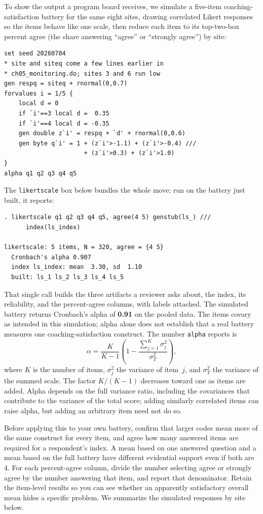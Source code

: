 To show the output a program board receives, we simulate a five-item coaching-satisfaction battery for the same eight sites, drawing correlated Likert responses so the items behave like one scale, then reduce each item to its top-two-box percent agree (the share answering \enquote{agree} or \enquote{strongly agree}) by site:
\par
{\footnotesize
\begin{verbatim}
set seed 20260704
* site and siteq come a few lines earlier in
* ch05_monitoring.do; sites 3 and 6 run low
gen respq = siteq + rnormal(0,0.7)
forvalues i = 1/5 {
    local d = 0
    if `i'==3 local d =  0.35
    if `i'==4 local d = -0.35
    gen double z`i' = respq + `d' + rnormal(0,0.6)
    gen byte q`i' = 1 + (z`i'>-1.1) + (z`i'>-0.4) ///
                      + (z`i'>0.3) + (z`i'>1.0)
}
alpha q1 q2 q3 q4 q5
\end{verbatim}
}
The \texttt{likertscale} box below bundles the whole move; run on the battery just built, it reports:
\par
{\footnotesize
\begin{verbatim}
. likertscale q1 q2 q3 q4 q5, agree(4 5) genstub(ls_) ///
      index(ls_index)

likertscale: 5 items, N = 320, agree = {4 5}
  Cronbach's alpha 0.907
  index ls_index: mean  3.30, sd  1.10
  built: ls_1 ls_2 ls_3 ls_4 ls_5
\end{verbatim}
}
That single call builds the three artifacts a reviewer asks about, the index, its reliability, and the percent-agree columns, with labels attached.
The simulated battery returns Cronbach's alpha of \textbf{0.91} on the pooled data. The items covary as intended in this simulation; alpha alone does not establish that a real battery measures one coaching-satisfaction construct. The number \texttt{alpha} reports is
\[
  \alpha=\frac{K}{K-1}\left(1-\frac{\sum_{j=1}^{K}\sigma_j^2}{\sigma_T^2}\right),
\]
where $K$ is the number of items, $\sigma_j^2$ the variance of item~$j$, and $\sigma_T^2$ the variance of the summed scale. The factor $K/(K-1)$ decreases toward one as items are added. Alpha depends on the full variance ratio, including the covariances that contribute to the variance of the total score; adding similarly correlated items can raise alpha, but adding an arbitrary item need not do so.

Before applying this to your own battery, confirm that larger codes mean more of the same construct for every item, and agree how many answered items are required for a respondent's index. A mean based on one answered question and a mean based on the full battery have different evidential support even if both are 4. For each percent-agree column, divide the number selecting agree or strongly agree by the number answering that item, and report that denominator. Retain the item-level results so you can see whether an apparently satisfactory overall mean hides a specific problem. We summarize the simulated responses by site below.

